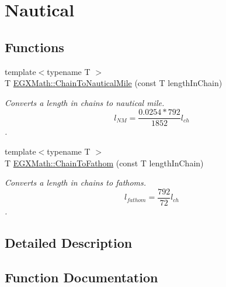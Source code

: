 \hypertarget{group___e_g_x_math-_conversions-_length_conversions-_imperial-_chain-_nautical}{}\section{Nautical}
\label{group___e_g_x_math-_conversions-_length_conversions-_imperial-_chain-_nautical}
\subsection*{Functions}
\begin{DoxyCompactItemize}
\item 
{\footnotesize template$<$typename T $>$ }\\T \mbox{\hyperlink{group___e_g_x_math-_conversions-_length_conversions-_imperial-_chain-_nautical_gad4c03e3aae08135e79dd4b6becc65d47}{E\+G\+X\+Math\+::\+Chain\+To\+Nautical\+Mile}} (const T length\+In\+Chain)
\begin{DoxyCompactList}\small\item\em Converts a length in chains to nautical mile. \[ l_{NM}= \frac{0.0254 * 792}{1852} l_{ch} \]. \end{DoxyCompactList}\item 
{\footnotesize template$<$typename T $>$ }\\T \mbox{\hyperlink{group___e_g_x_math-_conversions-_length_conversions-_imperial-_chain-_nautical_ga39e7643cd4567eba7c466c440e7992d6}{E\+G\+X\+Math\+::\+Chain\+To\+Fathom}} (const T length\+In\+Chain)
\begin{DoxyCompactList}\small\item\em Converts a length in chains to fathoms. \[ l_{fathom}= \frac{792}{72} l_{ch} \]. \end{DoxyCompactList}\end{DoxyCompactItemize}


\subsection{Detailed Description}


\subsection{Function Documentation}
\mbox{\label{group___e_g_x_math-_conversions-_length_conversions-_imperial-_chain-_nautical_ga39e7643cd4567eba7c466c440e7992d6}} 

